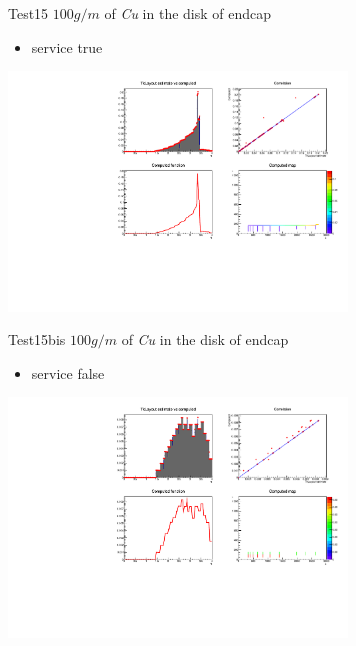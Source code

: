 \documentclass[pdftex, 11pt]{beamer}
\begin{document}
\begin{frame}
  \begin{block}{Test15}
    \alert{$100 g/m$} of \emph{Cu} in the disk of endcap
    \begin{itemize}
    \item \alert{service} true
    \end{itemize}
  \end{block}
  \begin{center}
    \includegraphics[width=9cm]{img/test15.pdf}
  \end{center}
\end{frame}

\begin{frame}
  \begin{block}{Test15bis}
    \alert{$100 g/m$} of \emph{Cu} in the disk of endcap
    \begin{itemize}
    \item \alert{service} false
    \end{itemize}
  \end{block}
  \begin{center}
    \includegraphics[width=9cm]{img/test15bis.pdf}
  \end{center}
\end{frame}
\end{document}
